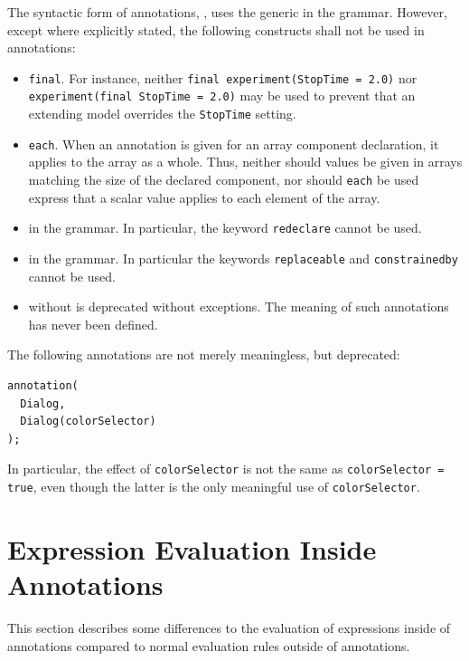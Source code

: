 The syntactic form of annotations, , uses the generic  in the grammar.
However, except where explicitly stated, the following constructs shall not be used in annotations:
\begin{itemize}
\item
\lstinline!final!.
For instance, neither \lstinline!final experiment(StopTime = 2.0)! nor \lstinline!experiment(final StopTime = 2.0)! may be used to prevent that an extending model overrides the \lstinline!StopTime! setting.
\item
\lstinline!each!.
When an annotation is given for an array component declaration, it applies to the array as a whole.
Thus, neither should values be given in arrays matching the size of the declared component, nor should \lstinline!each! be used express that a scalar value applies to each element of the array.
\item
{} in the grammar.
In particular, the keyword \lstinline!redeclare! cannot be used.
\item
{} in the grammar.
In particular the keywords \lstinline!replaceable! and \lstinline!constrainedby! cannot be used.
\item
{} without  is deprecated without exceptions.
The meaning of such annotations has never been defined.
\end{itemize}

\begin{example}
The following annotations are not merely meaningless, but deprecated:
\begin{lstlisting}[language=modelica]
annotation(
  Dialog,
  Dialog(colorSelector)
);
\end{lstlisting}
In particular, the effect of \lstinline!colorSelector! is not the same as \lstinline!colorSelector = true!, even though the latter is the only meaningful use of \lstinline!colorSelector!.
\end{example}


\section{Expression Evaluation Inside Annotations}\label{expression-evaluation-inside-annotations}

This section describes some differences to the evaluation of expressions inside of annotations compared to normal evaluation rules outside of annotations.



